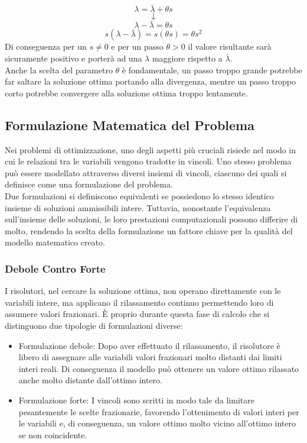 \documentclass[12pt,a4paper,twoside]{report}
\begin{document}
	\begin{equation}
		\lambda = \bar{\lambda}+\theta s
	\end{equation}
	$$\downarrow$$
	\begin{equation}
		\lambda - \bar{\lambda} = \theta s
	\end{equation}
	\begin{equation}
		s(\lambda-\bar{\lambda})=s(\theta s)=\theta s^2
	\end{equation}
	Di conseguenza per un $s\neq 0$ e per un passo $\theta > 0$ il valore risultante sarà sicuramente positivo e porterà ad una $\lambda$ maggiore rispetto a $\bar{\lambda}$. \smallskip \\
	Anche la scelta del parametro $\theta$ è fondamentale, un passo troppo grande potrebbe far saltare la soluzione ottima portando alla divergenza, mentre un passo troppo corto potrebbe convergere alla soluzione ottima troppo lentamente.
	\subsection{Formulazione Matematica del Problema}
	Nei problemi di ottimizzazione, uno degli aspetti più cruciali risiede nel modo in cui le relazioni tra le variabili vengono tradotte in vincoli.
	Uno stesso problema può essere modellato attraverso diversi insiemi di vincoli, ciascuno dei quali si definisce come una formulazione del problema. \medskip \\
	Due formulazioni si definiscono equivalenti se possiedono lo stesso identico insieme di soluzioni ammissibili intere. Tuttavia, nonostante l'equivalenza sull'insieme delle soluzioni, le loro prestazioni computazionali possono differire di molto, rendendo la scelta della formulazione un fattore chiave per la qualità del modello matematico creato.
	\subsubsection{Debole Contro Forte}
	I risolutori, nel cercare la soluzione ottima, non operano direttamente con le variabili intere, ma applicano il rilassamento continuo permettendo loro di assumere valori frazionari.
	È proprio durante questa fase di calcolo che si distinguono due tipologie di formulazioni diverse:
	\begin{itemize}
		\item Formulazione debole: Dopo aver effettuato il rilassamento, il risolutore è libero di assegnare alle variabili valori frazionari molto distanti dai limiti interi reali. Di conseguenza il modello può ottenere un valore ottimo rilassato anche molto distante dall'ottimo intero.
		\item Formulazione forte: I vincoli sono scritti in modo tale da limitare pesantemente le scelte frazionarie, favorendo l'ottenimento di valori interi per le variabili e, di conseguenza, un valore ottimo molto vicino all'ottimo intero se non coincidente.
	\end{itemize}
\end{document}
